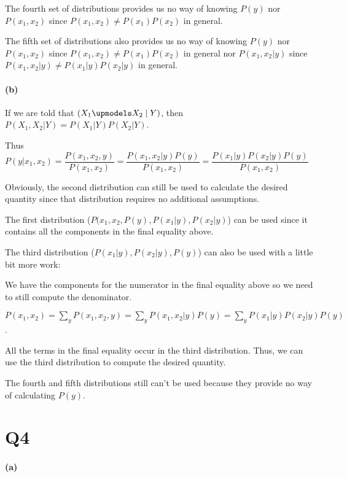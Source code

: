 \documentclass[11pt,a4paper]{article}
\begin{document}
The fourth set of distributions provides us no way of knowing $P(y)$ nor $P(x_{1},x_{2})$ since $P(x_{1},x_{2}) \neq P(x_{1})P(x_{2})$ in general.

The fifth set of distributions also provides us no way of knowing $P(y)$ nor $P(x_{1},x_{2})$ since $P(x_{1},x_{2}) \neq P(x_{1})P(x_{2})$ in general nor $P(x_{1},x_{2}|y)$ since $P(x_{1},x_{2}|y) \neq P(x_{1}|y)P(x_{2}|y)$ in general.

\paragraph*{(b)}
If we are told that $(X_{1} \upmodels X_{2} \mid Y)$, then $P(X_{1},X_{2}|Y) = P(X_{1}|Y)P(X_{2}|Y)$. \newline

Thus $P(y|x_{1},x_{2}) = \dfrac{P(x_{1},x_{2},y)}{P(x_{1},x_{2})} = \dfrac{P(x_{1},x_{2}|y)P(y)}{P(x_{1},x_{2})} = \dfrac{P(x_{1}|y)P(x_{2}|y)P(y)}{P(x_{1},x_{2})}$

Obviously, the second distribution can still be used to calculate the desired quantity since that distribution requires no additional assumptions.

The first distribution ($P(x_{1}, x_{2}, P(y), P(x_{1}|y), P(x_{2}|y)$) can be used since it contains all the components in the final equality above. 

The third distribution ($P(x_{1}|y), P(x_{2}|y), P(y)$) can also be used with a little bit more work:

We have the components for the numerator in the final equality above so we need to still compute the denominator.

$P(x_{1},x_{2}) = \sum\limits_{y} P(x_{1}, x_{2}, y) = \sum\limits_{y} P(x_{1}, x_{2} | y)P(y) = \sum\limits_{y} P(x_{1}|y)P(x_{2}|y)P(y)$.

All the terms in the final equality occur in the third distribution. Thus, we can use the third distribution to compute the desired quantity.

The fourth and fifth distributions still can't be used because they provide no way of calculating $P(y)$.

\section*{Q4}
\paragraph*{(a)}
\end{document}
